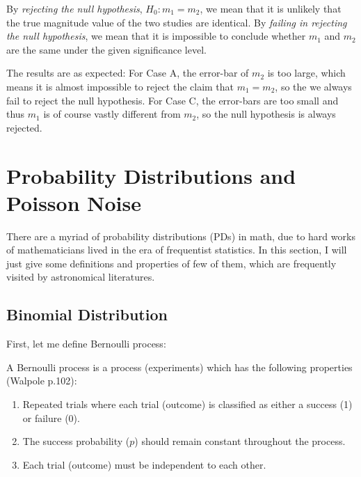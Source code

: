 By \textit{rejecting the null hypothesis}, $ H_0: m_1 = m_2 $, we mean that it is unlikely that the true magnitude value of the two studies are identical. By \textit{failing in rejecting the null hypothesis}, we mean that it is impossible to conclude whether $ m_1 $ and $ m_2 $ are the same under the given significance level. 

The results are as expected: For Case A, the error-bar of $ m_2 $ is too large, which means it is almost impossible to reject the claim that $ m_1 = m_2 $, so the we always fail to reject the null hypothesis. For Case C, the error-bars are too small and thus $ m_1 $ is of course vastly different from $ m_2 $, so the null hypothesis is always rejected.





\section{Probability Distributions and Poisson Noise}
There are a myriad of probability distributions (PDs) in math, due to hard works of mathematicians lived in the era of frequentist statistics. In this section, I will just give some definitions and properties of few of them, which are frequently visited by astronomical literatures.

\subsection{Binomial Distribution}
First, let me define Bernoulli process:
\begin{defn}
A Bernoulli process is a process (experiments) which has the following properties (Walpole p.102):
\begin{enumerate}
  \item Repeated trials where each trial (outcome) is classified as either a success (1) or failure (0).
  \item The success probability ($ p $) should remain constant throughout the process.
  \item Each trial (outcome) must be independent to each other.
\end{enumerate}
\end{defn}

